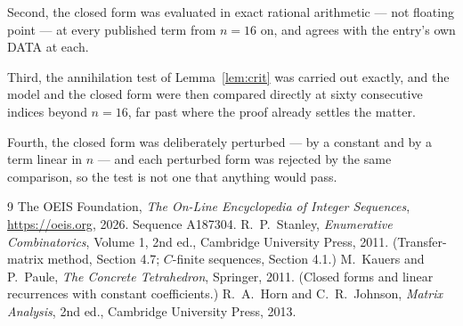 \documentclass[11pt,a4paper]{article}
\theoremstyle{plain}
\theoremstyle{definition}
\begin{document}
Second, the closed form was evaluated in exact rational arithmetic --- not floating point ---
at every published term from $n=16$ on, and agrees with the entry's own DATA at each.

Third, the annihilation test of Lemma~\ref{lem:crit} was carried out exactly, and the model
and the closed form were then compared directly at sixty consecutive indices beyond
$n=16$, far past where the proof already settles the matter.

Fourth, the closed form was deliberately perturbed --- by a constant and by a term linear in
$n$ --- and each perturbed form was rejected by the same comparison, so the test is not one
that anything would pass.

\begin{thebibliography}{9}
 The OEIS Foundation, \emph{The On-Line Encyclopedia of Integer
Sequences}, \url{https://oeis.org}, 2026. Sequence A187304.
 R.~P.~Stanley, \emph{Enumerative Combinatorics}, Volume 1, 2nd ed.,
Cambridge University Press, 2011. (Transfer-matrix method, Section 4.7; $C$-finite sequences,
Section 4.1.)
 M.~Kauers and P.~Paule, \emph{The Concrete Tetrahedron}, Springer, 2011.
(Closed forms and linear recurrences with constant coefficients.)
 R.~A.~Horn and C.~R.~Johnson, \emph{Matrix Analysis}, 2nd ed., Cambridge
University Press, 2013.
\end{thebibliography}
\end{document}
